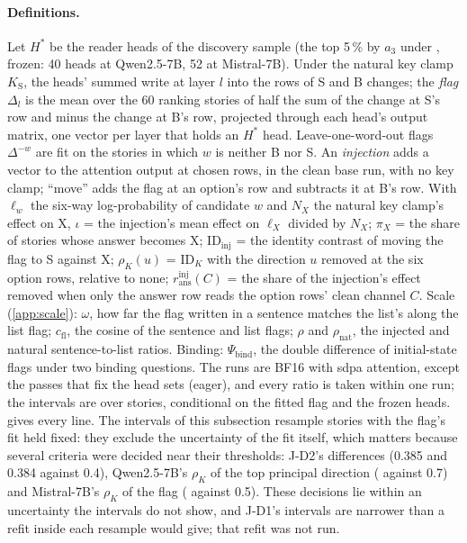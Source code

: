 \paragraph{Definitions.} Let $H^*$ be the reader heads of the discovery sample (the top 5\,\% by $a_3$ under \fmtOpt{}, frozen: 40 heads at Qwen2.5-7B, 52 at Mistral-7B). Under the natural key clamp $K_{\mathrm{S}}$, the heads' summed write at layer $l$ into the rows of S and B changes; the \emph{flag} $\Delta_l$ is the mean over the 60 ranking stories of half the sum of the change at S's row and minus the change at B's row, projected through each head's output matrix, one vector per layer that holds an $H^*$ head. Leave-one-word-out flags $\Delta^{-w}$ are fit on the stories in which $w$ is neither B nor S. An \emph{injection} adds a vector to the attention output at chosen rows, in the clean base run, with no key clamp; ``move'' adds the flag at an option's row and subtracts it at B's row. With $\ell_w$ the six-way log-probability of candidate $w$ and $N_X$ the natural key clamp's effect on X, $\iota$ = the injection's mean effect on $\ell_X$ divided by $N_X$; $\pi_X$ = the share of stories whose answer becomes X; $\mathrm{ID}_{\mathrm{inj}}$ = the identity contrast of moving the flag to S against X; $\rho_K(u)$ = $\mathrm{ID}_K$ with the direction $u$ removed at the six option rows, relative to none; $r_{\mathrm{ans}}^{\mathrm{inj}}(C)$ = the share of the injection's effect removed when only the answer row reads the option rows' clean channel $C$. Scale (\cref{app:scale}): $\omega$, how far the flag written in a sentence matches the list's along the list flag; $c_{\mathrm{fl}}$, the cosine of the sentence and list flags; $\rho$ and $\rho_{\mathrm{nat}}$, the injected and natural sentence-to-list ratios. Binding: $\Psi_{\mathrm{bind}}$, the double difference of initial-state flags under two binding questions. The runs are BF16 with sdpa attention, except the passes that fix the head sets (eager), and every ratio is taken within one run; the intervals are over stories, conditional on the fitted flag and the frozen heads.  gives every line. The intervals of this subsection resample stories with the flag's fit held fixed: they exclude the uncertainty of the fit itself, which matters because several criteria were decided near their thresholds: J-D2's differences (0.385 and 0.384 against 0.4), Qwen2.5-7B's $\rho_K$ of the top principal direction (\JdThreeRhoPconeQwenSeven{} against 0.7) and Mistral-7B's $\rho_K$ of the flag (\JdThreeRhoFlagMistralSeven{} against 0.5). These decisions lie within an uncertainty the intervals do not show, and J-D1's intervals are narrower than a refit inside each resample would give; that refit was not run. %

